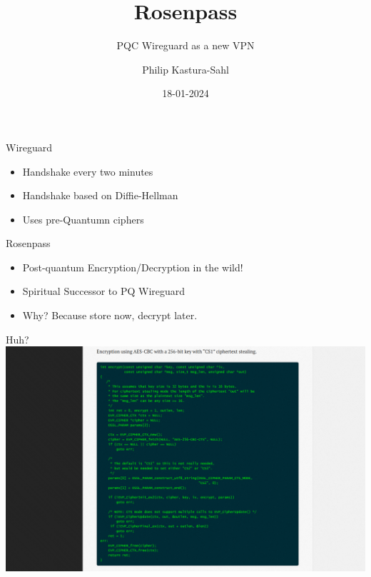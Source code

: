 \documentclass{rosenpass-beamer}
\title{Rosenpass}
\subtitle{PQC Wireguard as a new VPN}
\author{
Philip Kastura-Sahl
}
\institute{Universität Heidelberg}
\date{18-01-2024}
\begin{document}
\maketitle


\begin{frame}{Wireguard\cite{wireguard}}
\begin{itemize}
  \item Handshake every two minutes
  \item Handshake based on Diffie-Hellman
  \item Uses pre-Quantumn ciphers
\end{itemize}
\end{frame}


\begin{frame}{Rosenpass\cite{rosenpass}\cite{cryptoeprint:2020/379}}
\begin{itemize}
  \item Post-quantum Encryption/Decryption in the wild!
  \item Spiritual Successor to PQ Wireguard
  \item Why?
  Because store now, decrypt later.
\end{itemize}
\end{frame}


\begin{frame}{Huh?\cite{openssl-documentation}}
  \includegraphics[height=.9\textheight]{assets/opennssl-document.png}
\end{frame}
\end{document}
